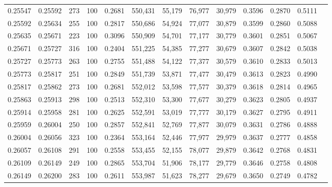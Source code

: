 \begin{tabular}{rrrrrrrrrrrrr}
0.25547 & 0.25592 &   273 & 100 &                                     0.2681 & 550,431 &  55,179 &  76,977 &  30,979 & 0.3596 & 0.2870 & 0.5111 \\
0.25592 & 0.25634 &   255 & 100 &                                     0.2817 & 550,686 &  54,924 &  77,077 &  30,879 & 0.3599 & 0.2860 & 0.5088 \\
0.25635 & 0.25671 &   223 & 100 &                                     0.3096 & 550,909 &  54,701 &  77,177 &  30,779 & 0.3601 & 0.2851 & 0.5067 \\
0.25671 & 0.25727 &   316 & 100 &                                     0.2404 & 551,225 &  54,385 &  77,277 &  30,679 & 0.3607 & 0.2842 & 0.5038 \\
0.25727 & 0.25773 &   263 & 100 &                                     0.2755 & 551,488 &  54,122 &  77,377 &  30,579 & 0.3610 & 0.2833 & 0.5013 \\
0.25773 & 0.25817 &   251 & 100 &                                     0.2849 & 551,739 &  53,871 &  77,477 &  30,479 & 0.3613 & 0.2823 & 0.4990 \\
0.25817 & 0.25862 &   273 & 100 &                                     0.2681 & 552,012 &  53,598 &  77,577 &  30,379 & 0.3618 & 0.2814 & 0.4965 \\
0.25863 & 0.25913 &   298 & 100 &                                     0.2513 & 552,310 &  53,300 &  77,677 &  30,279 & 0.3623 & 0.2805 & 0.4937 \\
0.25914 & 0.25958 &   281 & 100 &                                     0.2625 & 552,591 &  53,019 &  77,777 &  30,179 & 0.3627 & 0.2795 & 0.4911 \\
0.25959 & 0.26004 &   250 & 100 &                                     0.2857 & 552,841 &  52,769 &  77,877 &  30,079 & 0.3631 & 0.2786 & 0.4888 \\
0.26004 & 0.26056 &   323 & 100 &                                     0.2364 & 553,164 &  52,446 &  77,977 &  29,979 & 0.3637 & 0.2777 & 0.4858 \\
0.26057 & 0.26108 &   291 & 100 &                                     0.2558 & 553,455 &  52,155 &  78,077 &  29,879 & 0.3642 & 0.2768 & 0.4831 \\
0.26109 & 0.26149 &   249 & 100 &                                     0.2865 & 553,704 &  51,906 &  78,177 &  29,779 & 0.3646 & 0.2758 & 0.4808 \\
0.26149 & 0.26200 &   283 & 100 &                                     0.2611 & 553,987 &  51,623 &  78,277 &  29,679 & 0.3650 & 0.2749 & 0.4782 \\

\end{tabular}
